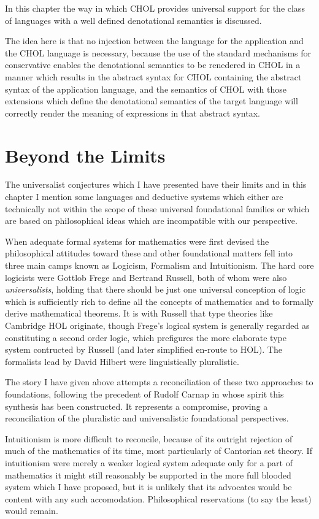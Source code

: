 \documentclass[10pt,titlepage]{book}
\begin{document}
In this chapter the way in which CHOL provides universal support for the class of languages with a well defined denotational semantics is discussed.

The idea here is that no injection between the language for the application and the CHOL language is necessary, because the use of the standard mechanisms for conservative enables the denotational semantics to be renedered in CHOL in a manner which results in the abstract syntax for CHOL containing the abstract syntax of the application language, and the semantics of CHOL with those extensions which define the denotational semantics of the target language will correctly render the meaning of expressions in that abstract syntax.

\chapter{Beyond the Limits}

The universalist conjectures which I have presented have their limits and in this chapter I mention some languages and deductive systems which either are technically not within the scope of these universal foundational families or which are based on philosophical ideas which are incompatible with our perspective.

When adequate formal systems for mathematics were first devised the philosophical attitudes toward these and other foundational matters fell into three main camps known as Logicism, Formalism and Intuitionism.
The hard core logicists were Gottlob Frege and Bertrand Russell, both of whom were also \emph{universalists}, holding that there should be just one universal conception of logic which is sufficiently rich to define all the concepts of mathematics and to formally derive mathematical theorems.
It is with Russell that type theories like Cambridge HOL originate, though Frege's logical system is generally regarded as constituting a second order logic, which prefigures the more elaborate type system contructed by Russell (and later simplified en-route to HOL).
The formalists lead by David Hilbert were linguistically pluralistic.

The story I have given above attempts a reconciliation of these two approaches to foundations, following the precedent of Rudolf Carnap in whose spirit this synthesis has been constructed.
It represents a compromise, proving a reconciliation of the pluralistic and universalistic foundational perspectives.

Intuitionism is more difficult to reconcile, because of its outright rejection of much of the mathematics of its time, most particularly of Cantorian set theory.
If intuitionism were merely a weaker logical system adequate only for a part of mathematics it might still reasonably be supported in the more full blooded system which I have proposed, but it is unlikely that its advocates would be content with any such accomodation.
Philosophical reservations (to say the least) would remain.
\end{document}
